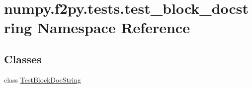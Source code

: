 \hypertarget{namespacenumpy_1_1f2py_1_1tests_1_1test__block__docstring}{}\section{numpy.\+f2py.\+tests.\+test\+\_\+block\+\_\+docstring Namespace Reference}
\label{namespacenumpy_1_1f2py_1_1tests_1_1test__block__docstring}
\subsection*{Classes}
\begin{DoxyCompactItemize}
\item 
class \hyperlink{classnumpy_1_1f2py_1_1tests_1_1test__block__docstring_1_1TestBlockDocString}{Test\+Block\+Doc\+String}
\end{DoxyCompactItemize}
